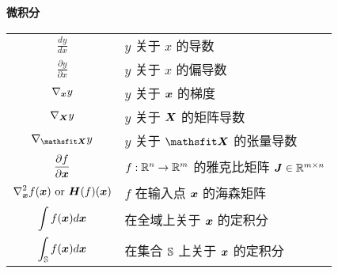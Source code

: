 \vspace{\notationgap}
\begin{minipage}{\textwidth}
\centerline{\bf 微积分}
\bgroup
\def\arraystretch{1.5}
\begin{tabular}{cp{3.25in}}
$\displaystyle\frac{d y} {d x}$ & $y$ 关于 $x$ 的导数\\ [2ex]
$\displaystyle \frac{\partial y} {\partial x} $ & $y$ 关于 $x$ 的偏导数\\
$\displaystyle \nabla_{\bm{x}} y $ & $y$ 关于 ${\bm{x}}$ 的梯度\\
$\displaystyle \nabla_{\bm{X}} y $ & $y$ 关于 ${\bm{X}}$ 的矩阵导数\\
$\displaystyle \nabla_\tX y $ & $y$ 关于 $\tX$ 的张量导数\\
$\displaystyle \frac{\partial f}{\partial {\bm{x}}} $ & $f: \mathbb{R}^n \rightarrow \mathbb{R}^m$ 的雅克比矩阵 ${\bm{J}} \in \mathbb{R}^{m\times n}$\\
$\displaystyle \nabla_{\bm{x}}^2 f({\bm{x}})\text{ or }{\bm{H}}( f)({\bm{x}})$ & $f$ 在输入点 ${\bm{x}}$ 的海森矩阵\\
$\displaystyle \int f({\bm{x}}) d{\bm{x}} $ & 在全域上关于 ${\bm{x}}$ 的定积分\\
$\displaystyle \int_{\mathbb{S}} f({\bm{x}}) d{\bm{x}}$ & 在集合 ${\mathbb{S}}$ 上关于 ${\bm{x}}$ 的定积分\\
\end{tabular}
\egroup
{}
\end{minipage}

